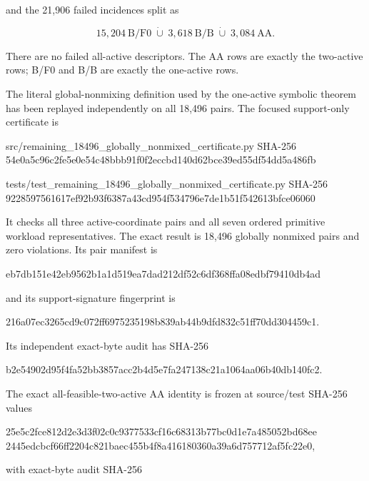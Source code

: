and the 21,906 failed incidences split as

\[
        15{,}204\ \mathrm{B/F0}
        \;\dot\cup\;3{,}618\ \mathrm{B/B}
        \;\dot\cup\;3{,}084\ \mathrm{AA}.          \tag{1.2}
\]

There are no failed all-active descriptors. The AA rows are exactly the
two-active rows; B/F0 and B/B are exactly the one-active rows.

The literal global-nonmixing definition used by the one-active symbolic
theorem has been replayed independently on all 18,496 pairs. The focused
support-only certificate is

\begin{CodeBlock}
src/remaining_18496_globally_nonmixed_certificate.py
SHA-256 54e0a5c96c2fe5e0e54c48bbb91f0f2eccbd140d62bce39ed55df54dd5a486fb

tests/test_remaining_18496_globally_nonmixed_certificate.py
SHA-256 9228597561617ef92b93f6387a43cd954f534796e7de1b51f542613bfce06060
\end{CodeBlock}

It checks all three active-coordinate pairs and all seven ordered
primitive workload representatives. The exact result is 18,496 globally
nonmixed pairs and zero violations. Its pair manifest is

\begin{CodeBlock}
eb7db151e42eb9562b1a1d519ea7dad212df52c6df368ffa08edbf79410db4ad
\end{CodeBlock}

and its support-signature fingerprint is

\begin{CodeBlock}
216a07ec3265cd9c072ff6975235198b839ab44b9dfd832c51ff70dd304459c1.
\end{CodeBlock}

Its independent exact-byte audit has SHA-256

\begin{CodeBlock}
b2e54902d95f4fa52bb3857acc2b4d5e7fa247138c21a1064aa06b40db140fc2.
\end{CodeBlock}

The exact all-feasible-two-active AA identity is frozen at source/test
SHA-256 values

\begin{CodeBlock}
25e5c2fce812d2e3d3f02c0c9377533cf16c68313b77bc0d1e7a485052bd68ee
2445edcbcf66ff2204c821baec455b4f8a416180360a39a6d757712af5fc22e0,
\end{CodeBlock}

with exact-byte audit SHA-256

